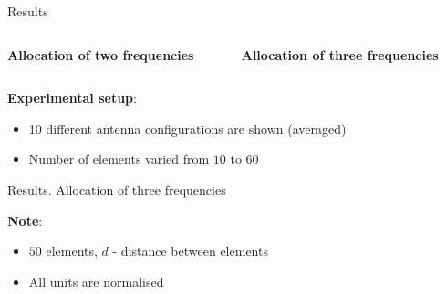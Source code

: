 \documentclass[../main.tex]{subfiles}
\begin{document}
\begin{frame}[t]{Results}
\begin{columns}[t]
\begin{column}{0.5\textwidth}
    \centering
    \textbf{Allocation of two frequencies}
    \begin{figure}[H]
    \centering
    \begin{adjustbox}{width=0.8\linewidth}
    
    \end{adjustbox}
    \end{figure}  
\end{column}
\begin{column}{0.5\textwidth}
    \centering
    \textbf{Allocation of three frequencies}
    \begin{figure}[H]
    \centering
    \begin{adjustbox}{width=0.8\linewidth}
    
    \end{adjustbox}
    \end{figure}  
\end{column}    
\end{columns}

\vspace{0.3cm}

\textbf{Experimental setup}:
\begin{itemize}
    \item 10 different antenna configurations are shown (averaged)
    \item Number of elements varied from $10$ to $60$
\end{itemize}

\end{frame}



\begin{frame}[t]{Results. Allocation of three frequencies}

\textbf{Note}:
\begin{itemize}
    \item $50$ elements, $d$ - distance between elements
    \item All units are normalised
\end{itemize}

\begin{columns}[b]
        \begin{column}{0.55\textwidth}
            \centering
            \begin{adjustbox}{width=1\columnwidth}
            
            \end{adjustbox}
        \end{column}
        \begin{column}{0.55\textwidth}
            \centering
            \begin{adjustbox}{width=1\columnwidth}
            
            \end{adjustbox}
        \end{column}
\end{columns}   

\end{frame}


%
%
\end{document}
